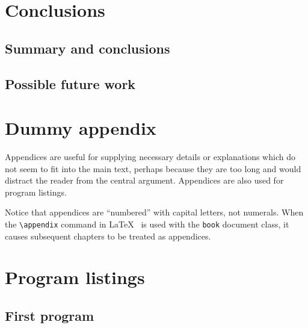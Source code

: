 \documentclass[12pt,openany,a4paper]{book}
\begin{document}
\chapter{Conclusions}

\section{Summary and conclusions}

\section{Possible future work}

\appendix


\newpage
{}
\mbox{}
\newpage



\chapter{Dummy appendix}

Appendices are useful for supplying necessary details or explanations
which do not seem to fit into the main text, perhaps because they are
too long and would distract the reader from the central argument.
Appendices are also used for program listings.

Notice that appendices are ``numbered'' with capital letters, not
numerals.  When the \verb+\appendix+ command in
\LaTeX~\cite[p.\,175]{lamport} is used with the \texttt{book} document
class, it causes subsequent chapters to be treated as appendices.

\chapter{Program listings}

\section{First program}
\end{document}
